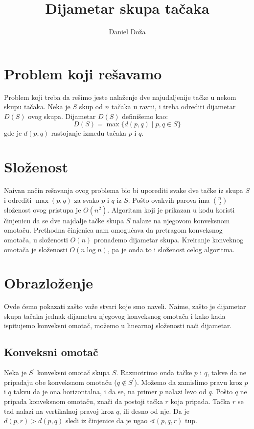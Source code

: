 \documentclass[a4paper]{article}
\begin{document}
\title{Dijametar skupa tačaka}

\author{Daniel Doža}


\maketitle


\section{Problem koji rešavamo}
Problem koji treba da rešimo jeste nalaženje dve najudaljenije tačke u nekom skupu
tačaka. Neka je \(S\) skup od \(n\) tačaka u ravni, i treba odrediti dijametar \(D(S)\)
ovog skupa. Dijametar \(D(S)\)  definišemo kao:
\[
    D(S) = \max\{d(p, q) \mid  p, q \in S\}
\]
gde je \(d(p, q)\) rastojanje između tačaka \(p \) i \(q \).


\section{Složenost}
Naivan način rešavanja ovog problema bio bi uporediti svake dve tačke iz skupa \(S\) i odrediti
\(\max(p, q)\) za svako \(p\) i \(q\) iz \(S\). Pošto ovakvih parova ima \({n \choose 2}\)
složenost ovog pristupa je \(O(n^{2})\). Algoritam koji je prikazan u kodu koristi činjenicu da
se dve najdalje tačke skupa \(S\) nalaze na njegovom konveksnom omotaču. Prethodna činjenica
nam omogućava da pretragom konveksnog omotača, u složenosti \(O(n)\) pronađemo dijametar skupa.
Kreiranje konveknog omotača je složenosti \(O(n\log{n})\), pa je onda to i složenost celog
algoritma.

\section{Obrazloženje}
Ovde ćemo pokazati zašto važe stvari koje smo naveli. Naime, zašto je dijametar skupa tačaka
jednak dijametru njegovog konveksnog omotača i kako kada ispitujemo konveksni omotač, možemo
u linearnoj složenosti naći dijametar.

\subsection{Konveksni omotač}
Neka je \(S^{'}\) konveksni omotač skupa \(S\). Razmotrimo onda tačke \(p\) i \(q\), takve da
ne pripadaju obe konveksnom omotaču (\(q \notin S^{\prime}\)). Možemo da zamislimo pravu kroz \(p\)
i \(q\) takvu da je ona horizontalna, i da se, na primer \(p\) nalazi levo od \(q\). Pošto \(q\)
ne pripada konveksnom omotaču, znači da postoji tačka \(r\) koja pripada. Tačka \(r\) se tad
nalazi na vertikalnoj pravoj kroz \(q\), ili desno od nje. Da je \(d(p, r) > d(p, q)\) sledi
iz činjenice da je ugao \(\sphericalangle(p, q, r)\) tup.
\end{document}
